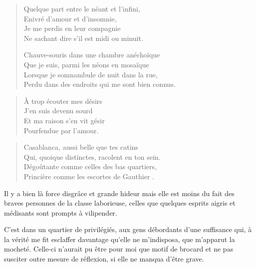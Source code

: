 \begin{verse}\quatrain
  Quelque part entre le néant et l’infini,\\ 
  Enivré d’amour et d’insomnie,\\ 
  Je me perdis en leur compagnie\\ 
  Ne sachant dire s’il est midi ou minuit.  %

  Chauve-souris dans une chambre anéchoïque\\ 
  Que je suis, parmi les néons en mosaïque\\ 
  Lorsque je somnambule de nuit dans la rue,\\ 
  Perdu dans des endroits qui me sont bien connus.  %
\end{verse}

\begin{verse}\quatrain
  À trop écouter mes désirs\\ 
  J’en suis devenu sourd\\ 
  Et ma raison s’en vit gésir\\ 
  Pourfendue par l’amour.  %
\end{verse}

\begin{verse}\quatrain
  Casablanca, aussi belle que tes catins\\ 
  Qui, quoique distinctes, racolent en ton sein.\\ 
  Dégoûtante comme celles des bas quartiers,\\ 
  Princière comme les escortes de Gauthier%
  .
\end{verse}

\begin{prose}
  Il y a bien là force disgrâce et grande hideur mais elle est moins du fait des braves personnes de la classe laborieuse, celles que quelques esprits aigris et médisants sont prompts à vilipender.

  C’est dans un quartier de privilégiés, aux gens débordants d’une suffisance qui, à la vérité me fit esclaffer davantage qu’elle ne m’indisposa, que m’apparut la mocheté. Celle-ci n’aurait pu être pour moi que motif de brocard et ne pas susciter outre mesure de réflexion, si elle ne manqua d’être grave.
\end{prose}

